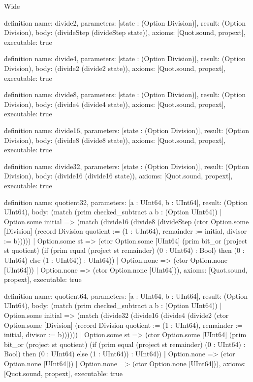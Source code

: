 \begin{lexlean}{Wide}
\begin{semanticmodule}
definition{
  name: divide2,
  parameters: [state : (Option Division)],
  result: (Option Division),
  body: (divideStep (divideStep state)),
  axioms: [Quot.sound, propext],
  executable: true
}

definition{
  name: divide4,
  parameters: [state : (Option Division)],
  result: (Option Division),
  body: (divide2 (divide2 state)),
  axioms: [Quot.sound, propext],
  executable: true
}

definition{
  name: divide8,
  parameters: [state : (Option Division)],
  result: (Option Division),
  body: (divide4 (divide4 state)),
  axioms: [Quot.sound, propext],
  executable: true
}

definition{
  name: divide16,
  parameters: [state : (Option Division)],
  result: (Option Division),
  body: (divide8 (divide8 state)),
  axioms: [Quot.sound, propext],
  executable: true
}

definition{
  name: divide32,
  parameters: [state : (Option Division)],
  result: (Option Division),
  body: (divide16 (divide16 state)),
  axioms: [Quot.sound, propext],
  executable: true
}

definition{
  name: quotient32,
  parameters: [a : UInt64, b : UInt64],
  result: (Option UInt64),
  body: (match (prim checked_subtract a b : (Option UInt64))
    | Option.some initial => (match (divide16 (divide8 (divideStep (ctor Option.some [Division] (record Division {quotient := (1 : UInt64), remainder := initial, divisor := b})))))
      | Option.some st => (ctor Option.some [UInt64] (prim bit_or (project st quotient) (if (prim equal (project st remainder) (0 : UInt64) : Bool) then (0 : UInt64) else (1 : UInt64)) : UInt64))
      | Option.none => (ctor Option.none [UInt64]))
    | Option.none => (ctor Option.none [UInt64])),
  axioms: [Quot.sound, propext],
  executable: true
}

definition{
  name: quotient64,
  parameters: [a : UInt64, b : UInt64],
  result: (Option UInt64),
  body: (match (prim checked_subtract a b : (Option UInt64))
    | Option.some initial => (match (divide32 (divide16 (divide4 (divide2 (ctor Option.some [Division] (record Division {quotient := (1 : UInt64), remainder := initial, divisor := b}))))))
      | Option.some st => (ctor Option.some [UInt64] (prim bit_or (project st quotient) (if (prim equal (project st remainder) (0 : UInt64) : Bool) then (0 : UInt64) else (1 : UInt64)) : UInt64))
      | Option.none => (ctor Option.none [UInt64]))
    | Option.none => (ctor Option.none [UInt64])),
  axioms: [Quot.sound, propext],
  executable: true
}
\end{semanticmodule}
\end{lexlean}

